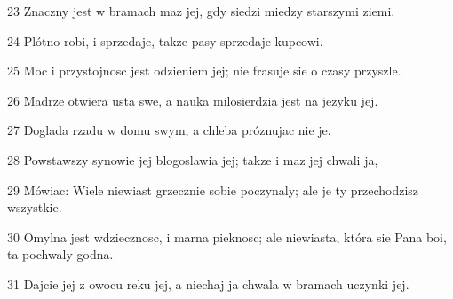 \par 23 Znaczny jest w bramach maz jej, gdy siedzi miedzy starszymi ziemi.
\par 24 Plótno robi, i sprzedaje, takze pasy sprzedaje kupcowi.
\par 25 Moc i przystojnosc jest odzieniem jej; nie frasuje sie o czasy przyszle.
\par 26 Madrze otwiera usta swe, a nauka milosierdzia jest na jezyku jej.
\par 27 Doglada rzadu w domu swym, a chleba próznujac nie je.
\par 28 Powstawszy synowie jej blogoslawia jej; takze i maz jej chwali ja,
\par 29 Mówiac: Wiele niewiast grzecznie sobie poczynaly; ale je ty przechodzisz wszystkie.
\par 30 Omylna jest wdziecznosc, i marna pieknosc; ale niewiasta, która sie Pana boi, ta pochwaly godna.
\par 31 Dajcie jej z owocu reku jej, a niechaj ja chwala w bramach uczynki jej.


